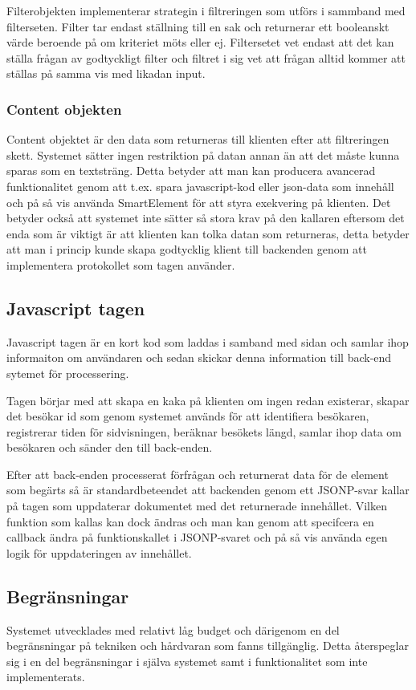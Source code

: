 Filterobjekten implementerar strategin i filtreringen som utförs i sammband med filterseten. Filter tar endast ställning till en sak och returnerar ett booleanskt värde beroende på om kriteriet möts eller ej. Filtersetet vet endast att det kan ställa frågan av godtyckligt filter och filtret i sig vet att frågan alltid kommer att ställas på samma vis med likadan input.

\subsubsection{Content objekten}



Content objektet är den data som returneras till klienten efter att filtreringen skett. Systemet sätter ingen restriktion på datan annan än att det måste kunna sparas som en textsträng. Detta betyder att man kan producera avancerad funktionalitet genom att t.ex. spara javascript-kod eller json-data som innehåll och på så vis använda SmartElement för att styra exekvering på klienten. Det betyder också att systemet inte sätter så stora krav på den kallaren eftersom det enda som är viktigt är att klienten kan tolka datan som returneras, detta betyder att man i princip kunde skapa godtycklig klient till backenden genom att implementera protokollet som tagen använder.

\subsection{Javascript tagen}

Javascript tagen är en kort kod som laddas i samband med sidan och samlar ihop informaiton om användaren och sedan skickar denna information till back-end sytemet för processering.

Tagen börjar med att skapa en kaka på klienten om ingen redan existerar, skapar det besökar id som genom systemet används för att identifiera besökaren, registrerar tiden för sidvisningen, beräknar besökets längd, samlar ihop data om besökaren och sänder den till back-enden.

Efter att back-enden processerat förfrågan och returnerat data för de element som begärts så är standardbeteendet att backenden genom ett JSONP-svar kallar på tagen som uppdaterar dokumentet med det returnerade innehållet. Vilken funktion som kallas kan dock ändras och man kan genom att specifcera en callback ändra på funktionskallet i JSONP-svaret och på så vis använda egen logik för uppdateringen av innehållet.

\subsection{Begränsningar}

Systemet utvecklades med relativt låg budget och därigenom en del begränsningar på tekniken och hårdvaran som fanns tillgänglig. Detta återspeglar sig i en del begränsningar i själva systemet samt i funktionalitet som inte implementerats.



